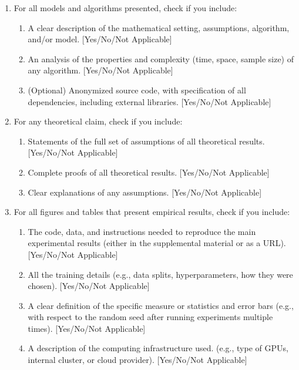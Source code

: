 \documentclass[10pt,twoside,letterpaper]{article}
\begin{document}
\begin{enumerate}

  \item For all models and algorithms presented, check if you include:
  \begin{enumerate}
    \item A clear description of the mathematical setting, assumptions, algorithm, and/or model. [Yes/No/Not Applicable]
    \item An analysis of the properties and complexity (time, space, sample size) of any algorithm. [Yes/No/Not Applicable]
    \item (Optional) Anonymized source code, with specification of all dependencies, including external libraries. [Yes/No/Not Applicable]
  \end{enumerate}

  \item For any theoretical claim, check if you include:
  \begin{enumerate}
    \item Statements of the full set of assumptions of all theoretical results. [Yes/No/Not Applicable]
    \item Complete proofs of all theoretical results. [Yes/No/Not Applicable]
    \item Clear explanations of any assumptions. [Yes/No/Not Applicable]
  \end{enumerate}

  \item For all figures and tables that present empirical results, check if you include:
  \begin{enumerate}
    \item The code, data, and instructions needed to reproduce the main experimental results (either in the supplemental material or as a URL). [Yes/No/Not Applicable]
    \item All the training details (e.g., data splits, hyperparameters, how they were chosen). [Yes/No/Not Applicable]
    \item A clear definition of the specific measure or statistics and error bars (e.g., with respect to the random seed after running experiments multiple times). [Yes/No/Not Applicable]
    \item A description of the computing infrastructure used. (e.g., type of GPUs, internal cluster, or cloud provider). [Yes/No/Not Applicable]
  \end{enumerate}


\end{enumerate}
\end{document}

